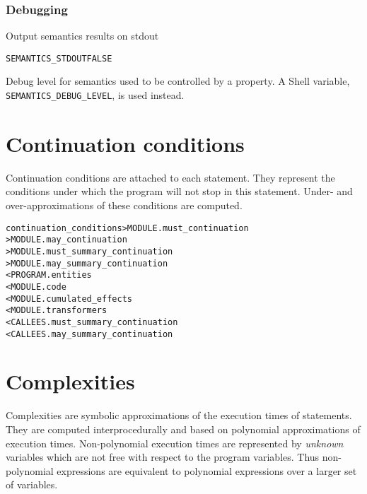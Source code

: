 \documentclass[a4paper]{report}
\newenvironment{PipsProp}{\begin{alltt}}{\end{alltt}}
\newenvironment{PipsMake}{\begin{alltt}}{\end{alltt}}
\begin{document}
\subsubsection{Debugging}

Output semantics results on stdout

\begin{PipsProp}
SEMANTICS_STDOUT FALSE
\end{PipsProp}

Debug level for semantics used to be controlled by a property. A Shell
variable, \verb/SEMANTICS_DEBUG_LEVEL/, is used instead.



\section{Continuation conditions}
\label{subsection-continuation-conditions}

Continuation conditions are attached to each statement. They represent the
conditions under which the program will not stop in this statement. Under-
and over-approximations of these conditions are computed.

\begin{PipsMake}
continuation_conditions > MODULE.must_continuation
                        > MODULE.may_continuation
                        > MODULE.must_summary_continuation
                        > MODULE.may_summary_continuation
        < PROGRAM.entities
        < MODULE.code
        < MODULE.cumulated_effects
        < MODULE.transformers
        < CALLEES.must_summary_continuation
        < CALLEES.may_summary_continuation
\end{PipsMake}


\section{Complexities}
\label{subsection-complexities}

Complexities are symbolic approximations of the execution times of
statements. They are computed interprocedurally and based on polynomial
approximations of execution times. Non-polynomial execution times are
represented by {\em unknown} variables which are not free with respect
to the program variables. Thus non-polynomial expressions are equivalent
to polynomial expressions over a larger set of variables.
\end{document}
